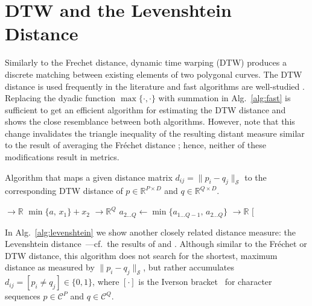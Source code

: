 \newpage

\section{DTW and the Levenshtein Distance}
\label{sec:dtw_levenshtein}
Similarly to the Frechet distance, dynamic time warping (DTW) produces a discrete matching between existing elements of two polygonal curves.
The DTW distance is used frequently in the literature and fast algorithms are well-studied \citep{salvador07,praetzlich16,silva16,herrmann21}.
Replacing the dyadic function $\max\{ \cdot, \cdot \}$ with summation in Alg.~\ref{alg:fast} is sufficient to get an efficient algorithm for estimating the DTW distance and shows the close resemblance between both algorithms.
However, note that this change invalidates the triangle inequality of the resulting distant measure similar to the result of averaging the Fr\'echet distance \citep{brakatsoulas05}; hence, neither of these modifications result in metrics.
\begin{algorithm}
    \caption{Algorithm that maps a given distance matrix $d_{ij} = \| p_i - q_j \|_\mathcal{S}$ to the corresponding DTW distance of $p \in \mathbb{R}^{P \times D}$ and $q \in \mathbb{R}^{Q \times D}$.}
    \begin{algorithmic}[1]
         $\to \mathbb{R}$
            \State \Return $\min\{ a,\, x_1 \} + x_2$
        \EndFunction
        \Statex
         $\to \mathbb{R}^Q$
            \State $a_{2 \ldots Q} \gets \min\{ a_{1 \ldots Q-1},\, a_{2 \ldots Q} \}$
            \State \Return {}
        \EndFunction
        \Statex
         $\to \mathbb{R}$
            \State \Return $[$
        \EndFunction
    \end{algorithmic}
\end{algorithm}

In Alg.~\ref{alg:levenshtein} we show another closely related distance measure: the Levenshtein distance~\cite{levenshtein65}---cf.~the results of \citet{wagner74} and \citet{hirschberg75}.
Although similar to the Fr\'echet or DTW distance, this algorithm does not search for the shortest, maximum distance as measured by $\| p_i - q_j \|_\mathcal{S}$, but rather accumulates $d_{ij} = [p_i \neq q_j] 
\in \{ 0, 1 \}$, where $[ \cdot ]$ is the Iverson bracket~\citep{knuth92} for character sequences $p \in \mathcal{C}^P$ and $q \in \mathcal{C}^Q$.


